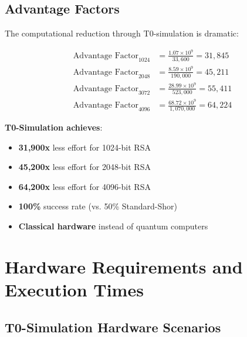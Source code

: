 \documentclass[12pt,a4paper]{article}
\begin{document}
	\subsection{Advantage Factors}
	
	The computational reduction through T0-simulation is dramatic:
	
	\begin{align}
		\text{Advantage Factor}_{1024} &= \frac{1.07 \times 10^9}{33,600} = 31,845 \\
		\text{Advantage Factor}_{2048} &= \frac{8.59 \times 10^9}{190,000} = 45,211 \\
		\text{Advantage Factor}_{3072} &= \frac{28.99 \times 10^9}{523,000} = 55,411 \\
		\text{Advantage Factor}_{4096} &= \frac{68.72 \times 10^9}{1,070,000} = 64,224
	\end{align}
	
	\begin{tcolorbox}[colback=green!5!white,colframe=green!75!black,title=Revolutionary Efficiency Improvement]
		\textbf{T0-Simulation achieves}:
		\begin{itemize}
			\item \textbf{31,900x} less effort for 1024-bit RSA
			\item \textbf{45,200x} less effort for 2048-bit RSA
			\item \textbf{64,200x} less effort for 4096-bit RSA
			\item \textbf{100\%} success rate (vs. 50\% Standard-Shor)
			\item \textbf{Classical hardware} instead of quantum computers
		\end{itemize}
	\end{tcolorbox}
	
	\section{Hardware Requirements and Execution Times}
	
	\subsection{T0-Simulation Hardware Scenarios}
	
\end{document}
